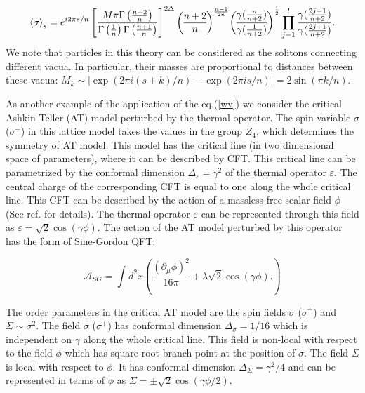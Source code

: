 \documentclass[a4paper,12pt]{article}
\begin{document}
\begin{displaymath}
\left\langle \sigma \right\rangle _s=e^{i2\pi s/n}\left[ \frac{M\pi \Gamma
\left( \frac{n+2}n\right) }{\Gamma \left( \frac 1n\right) \Gamma \left( 
\frac{n+1}n\right) }\right] ^{2\Delta }{n+2 \overwithdelims() n}
^{\frac{n-1}{2n}}{\gamma (\frac n{n+2}) \overwithdelims() \gamma (\frac 1{n+2})}
^{\frac 12}\prod_{j=1}^l\frac{\gamma (\frac{2j-1}{n+2})}{\gamma (\frac{2j+1}{n+2})}.
\end{displaymath}
We note that particles in this theory can be considered as the solitons
connecting different vacua. In particular, their masses are proportional to
distances between these vacua: $M_k\sim \left| \exp (2\pi i(s+k)/n)-\exp
(2\pi is/n)\right| =2\sin (\pi k/n)$.

As another example of the application of the eq.(\ref{wv}) we consider the
critical Ashkin Teller (AT) model perturbed by the thermal operator. The
spin variable $\sigma $ ($\sigma ^{+}$) in this lattice model takes the
values in the group $Z_4$, which determines the symmetry of AT model. This
model has the critical line (in two dimensional space of parameters), where
it can be described by CFT. This critical line can be parametrized by the
conformal dimension $\Delta _\varepsilon =\gamma ^2$ of the thermal operator 
$\varepsilon $. The central charge of the corresponding CFT is equal to one
along the whole critical line. This CFT can be described by the action of a
massless free scalar field $\phi $ (See ref. \cite{ZAT} for details). The
thermal operator $\varepsilon $ can be represented through this 
field as $\varepsilon =\sqrt{2}\cos (\gamma \phi )$. 
The action of the AT model
perturbed by this operator has the form of Sine-Gordon QFT:

\begin{equation}
\mathcal{A}_{SG}=\int d^2x\left( \frac{(\partial _\mu \phi )^2}{16\pi }
+\lambda \sqrt{2}\cos (\gamma \phi ).\right)   \label{asG}
\end{equation}

The order parameters in the critical AT model are the spin fields 
$\sigma $ ($\sigma ^{+}$) and $\Sigma \sim \sigma ^2$. 
The field $\sigma $ ($\sigma ^{+}$) has conformal dimension 
$\Delta _\sigma =1/16$ which is independent on 
$\gamma $ along the whole critical line. 
This field is non-local with respect
to the field $\phi $ which has square-root branch point at the position of 
$\sigma $. The field $\Sigma $ is local with respect to $\phi $. It has
conformal dimension $\Delta _\Sigma =\gamma ^2/4$ and can be represented in
terms of $\phi $ as $\Sigma =\pm \sqrt{2}\cos (\gamma \phi /2)$.
\end{document}
